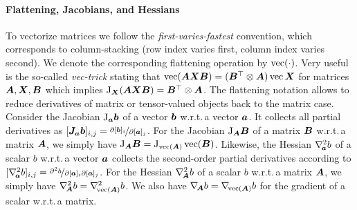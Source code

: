 \paragraph{Flattening, Jacobians, and Hessians}
To vectorize %
matrices %
we follow the %
\emph{first-varies-fastest} convention, which corresponds to column-stacking (row index varies first, column index varies second).
We denote the corresponding flattening operation by $\operatorname{vec}(\cdot)$.
Very useful is the so-called \emph{vec-trick} stating that $\operatorname{vec}({\bm{A}}{\bm{X}}{\bm{B}}) = ({\bm{B}}^\top\otimes {\bm{A}})\operatorname{vec}{{\bm{X}}}$
for matrices ${\bm{A}}, {\bm{X}}, {\bm{B}}$ %
which implies $\mathrm{J}_{\bm{X}}({\bm{A}}{\bm{X}}{\bm{B}}) = {\bm{B}}^\top\otimes {\bm{A}}$.
The flattening notation allows to reduce derivatives of matrix or tensor-valued objects back to the matrix case.
Consider the Jacobian $\mathrm{J}_{{\bm{a}}}{\bm{b}}$ of a vector ${\bm{b}}$ w.r.t.\,a vector ${\bm{a}}$.
It collects all partial derivatives as $[{\bm{J}}_{{\bm{a}}}{\bm{b}}]_{i,j} = \nicefrac{\partial [{\bm{b}}]_i}{\partial [{\bm{a}}]_j}$.
For the Jacobian $\mathrm{J}_{{\bm{A}}}{\bm{B}}$ of a matrix ${\bm{B}}$ w.r.t.\,a matrix ${\bm{A}}$, we simply have $\mathrm{J}_{{\bm{A}}} {\bm{B}} = \mathrm{J}_{\operatorname{vec}( {\bm{A}} )}\operatorname{vec}({\bm{B}})$.
Likewise, the Hessian $\nabla_{\!{{\bm{a}}}}^{2}b$ of a scalar $b$ w.r.t.\,a vector ${\bm{a}}$ collects the second-order partial derivatives according to $[\nabla_{\!{{\bm{a}}}}^{2}b]_{i,j} = \nicefrac{\partial^2 b}{\partial [{\bm{a}}]_i \partial [{\bm{a}}]_j}$.
For the Hessian $\nabla_{\!{{\bm{A}}}}^{2} b$ of a scalar $b$ w.r.t.\,a matrix ${\bm{A}}$, we simply have $\nabla_{\!{{\bm{A}}}}^{2} b = \nabla_{\!{\operatorname{vec}({\bm{A}})}}^{2}b$.
We also have $\nabla_{\!{{\bm{A}}}} b = \nabla_{\!{\operatorname{vec}({\bm{A}})}} b$ for the gradient of a scalar w.r.t.\,a matrix.

